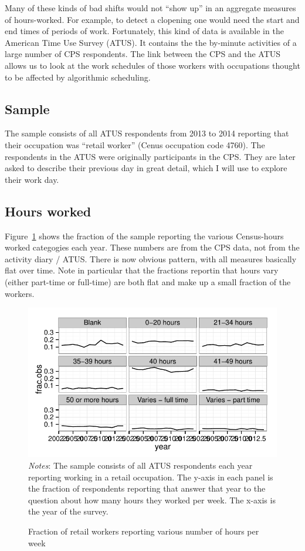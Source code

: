 \documentclass[11pt]{article}
\begin{document}
Many of these kinds of bad shifts would not ``show up'' in an aggregate measures of hours-worked. 
For example, to detect a clopening one would need the start and end times of periods of work.
Fortunately, this kind of data is available in the American Time Use Survey (ATUS).
It contains the the by-minute activities of a large number of CPS respondents.
The link between the CPS and the ATUS allows us to look at the work schedules of those workers with occupations thought to be affected by algorithmic scheduling. 

\subsection{Sample}
The sample consists of all ATUS respondents from 2013 to 2014 reporting that their occupation was ``retail worker'' (Cenus occupation code 4760). 
The respondents in the ATUS were originally participants in the CPS.
They are later asked to describe their previous day in great detail, which I will use to explore their work day.

\subsection{Hours worked} 

Figure~\ref{fig:hours_reporting} shows the fraction of the sample reporting the various Census-hours worked categogies each year.
These numbers are from the CPS data, not from the activity diary / ATUS. 
There is now obvious pattern, with all measures basically flat over time.
Note in particular that the fractions reportin that hours vary (either part-time or full-time) are both flat and make up a small fraction of the workers. 

\begin{figure}[h]
\centering 
\caption{Fraction of retail workers reporting various number of hours per week} \label{fig:hours_reporting}
\begin{minipage}{0.90 \linewidth}
\includegraphics[width = \linewidth]{./plots/hours_reporting.pdf}
\\
\emph{Notes}: The sample consists of all ATUS respondents each year reporting working in a retail occupation.
The y-axis in each panel is the fraction of respondents reporting that answer that year to the question about how many hours they worked per week.
The x-axis is the year of the survey. 
\end{minipage} 
\end{figure}
\end{document}
